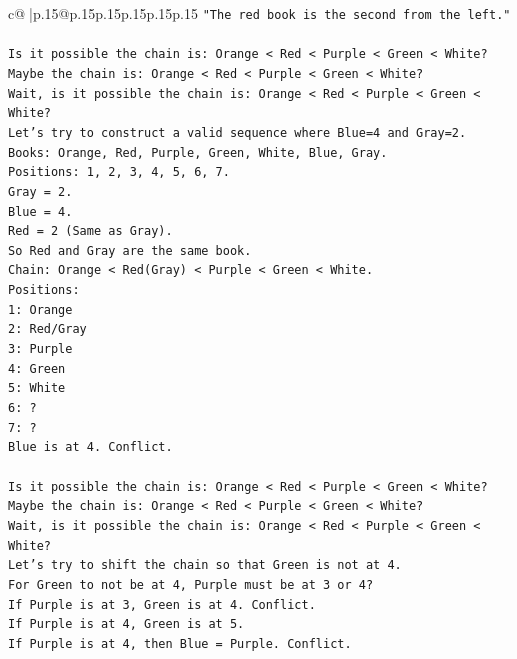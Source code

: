 \documentclass{article}
\begin{document}
{\begin{supertabular}{c@{$\;$}|p{.15\linewidth}@{}p{.15\linewidth}p{.15\linewidth}p{.15\linewidth}p{.15\linewidth}p{.15\linewidth}}
{{{\texttt{"The red book is the second from the left."} \\
\\ 
\texttt{Is it possible the chain is: Orange < Red < Purple < Green < White?} \\
\texttt{Maybe the chain is: Orange < Red < Purple < Green < White?} \\
\texttt{Wait, is it possible the chain is: Orange < Red < Purple < Green < White?} \\
\texttt{Let's try to construct a valid sequence where Blue=4 and Gray=2.} \\
\texttt{Books: Orange, Red, Purple, Green, White, Blue, Gray.} \\
\texttt{Positions: 1, 2, 3, 4, 5, 6, 7.} \\
\texttt{Gray = 2.} \\
\texttt{Blue = 4.} \\
\texttt{Red = 2 (Same as Gray).} \\
\texttt{So Red and Gray are the same book.} \\
\texttt{Chain: Orange < Red(Gray) < Purple < Green < White.} \\
\texttt{Positions:} \\
\texttt{1: Orange} \\
\texttt{2: Red/Gray} \\
\texttt{3: Purple} \\
\texttt{4: Green} \\
\texttt{5: White} \\
\texttt{6: ?} \\
\texttt{7: ?} \\
\texttt{Blue is at 4. Conflict.} \\
\\ 
\texttt{Is it possible the chain is: Orange < Red < Purple < Green < White?} \\
\texttt{Maybe the chain is: Orange < Red < Purple < Green < White?} \\
\texttt{Wait, is it possible the chain is: Orange < Red < Purple < Green < White?} \\
\texttt{Let's try to shift the chain so that Green is not at 4.} \\
\texttt{For Green to not be at 4, Purple must be at 3 or 4?} \\
\texttt{If Purple is at 3, Green is at 4. Conflict.} \\
\texttt{If Purple is at 4, Green is at 5.} \\
\texttt{If Purple is at 4, then Blue = Purple. Conflict.} \\
}}}
\end{supertabular}}
\end{document}
